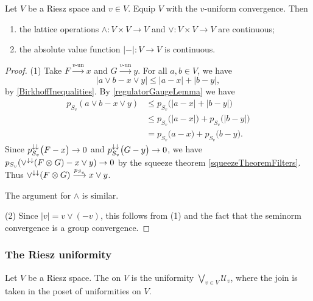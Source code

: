 \begin{proposition}
Let $V$ be a Riesz space and $v\in V$. Equip $V$ with the $v$-uniform convergence. Then
\begin{enumerate}
\item the lattice operations $\wedge: V\times V\to V$ and $\vee: V\times V\to V$ are continuous;
\item the absolute value function $|-|: V\to V$ is continuous.
\end{enumerate}
\end{proposition}
\begin{proof}
(1) Take $F\overset{\text{$v$-un}}{\longrightarrow} x$ and $G\overset{\text{$v$-un}}{\longrightarrow} y$. For all $a,b\in V$, we have
\[ |a\vee b - x\vee y| \leq |a-x| + |b-y|, \]
by \ref{BirkhoffInequalities}. By \ref{regulatorGaugeLemma} we have
\begin{align*}
p_{S_v}(a\vee b - x\vee y) &\leq p_{S_v}\big(|a-x| + |b-y|\big) \\
&\leq p_{S_v}\big(|a-x|\big) + p_{S_v}\big(|b-y|\big) \\
&= p_{S_v}\big(a-x\big) + p_{S_v}\big(b-y\big).
\end{align*}
Since $p_{S_v}^{\downarrow\downarrow}\big(F-x\big) \to 0$ and $p_{S_v}^{\downarrow\downarrow}\big(G-y\big) \to 0$, we have $p_{S_v}(\vee^{\downarrow\downarrow}(F\otimes G) - x\vee y) \to 0$ by the squeeze theorem \ref{squeezeTheoremFilters}. Thus $\vee^{\downarrow\downarrow}(F\otimes G) \overset{p_{S_v}}{\longrightarrow} x\vee y$.

The argument for $\wedge$ is similar.

(2) Since $|v| = v\vee (-v)$, this follows from (1) and the fact that the seminorm convergence is a group convergence.
\end{proof}



\subsubsection{The Riesz uniformity}
\begin{definition}
Let $V$ be a Riesz space. The  on $V$ is the uniformity $\bigvee_{v\in V} \mathcal{U}_v$, where the join is taken in the poset of uniformities on $V$.
\end{definition}

